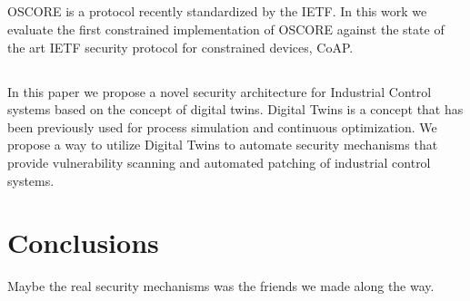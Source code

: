 \subsection{\paperIIItitle}
OSCORE is a protocol recently standardized by the IETF. In this work we evaluate the first constrained implementation of OSCORE against the state of the art IETF security protocol for constrained devices, CoAP. 
\subsection{\paperIVtitle}
In this paper we propose a novel security architecture for Industrial Control systems based on the concept of digital twins. Digital Twins is a concept that has been previously used for process simulation and continuous optimization. We propose a way to utilize Digital Twins to automate security mechanisms that provide vulnerability scanning and automated patching of industrial control systems.

\section{Conclusions}
Maybe the real security mechanisms was the friends we made along the way.
\label{sec:kappa-conclusions}
{ \raggedright
\printbibliography[segment=\therefsegment,heading=bibintoc]
}
